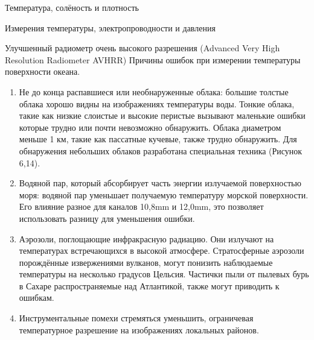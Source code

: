 \begin{chapter}{Температура, солёность и плотность}
\begin{section}{Измерения температуры, электропроводности и давления}
\begin{paragraph}{Улучшенный радиометр очень высокого разрешения (Advanced Very High Resolution Radiometer AVHRR)}
Причины ошибок при измерении температуры поверхности океана. 
%
%
\begin{enumerate}
\item
Не до конца распавшиеся или необнаруженные облака: большие толстые
облака хорошо видны на изображениях температуры воды. Тонкие облака,
такие как низкие слоистые и высокие перистые вызывают маленькие ошибки
которые трудно или почти невозможно обнаружить. Облака диаметром
меньше 1 км, такие как пассатные кучевые, также трудно обнаружить. Для
обнаружения небольших облаков разработана специальная техника (Рисунок
6,14).
%

\item
Водяной пар, который абсорбирует часть энергии излучаемой поверхностью
моря: водяной пар уменьшает получаемую температуру морской
поверхности. Его влияние разное для каналов 10,8mm и 12,0mm, это
позволяет использовать разницу для уменьшения ошибки.
%


\item
Аэрозоли, поглощающие инфракрасную радиацию. Они излучают на
температурах встречающихся в высокой атмосфере. Стратосферные аэрозоли
порождённые извержениями вулканов, могут понизить наблюдаемые
температуры на несколько градусов Цельсия. Частички пыли от пылевых
бурь в Сахаре распространяемые над Атлантикой, также могут приводить к
ошибкам.
%


\item
Инструментальные помехи стремяться уменьшить, ограничевая
температурное разрешение на изображениях локальных районов.


\end{enumerate}
\end{paragraph}
\end{section}
\end{chapter}
